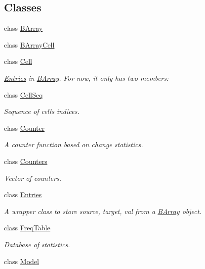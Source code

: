 \subsection*{Classes}
\begin{DoxyCompactItemize}
\item 
class \hyperlink{classbarry_1_1_b_array}{B\+Array}
\item 
class \hyperlink{classbarry_1_1_b_array_cell}{B\+Array\+Cell}
\item 
class \hyperlink{classbarry_1_1_cell}{Cell}
\begin{DoxyCompactList}\small\item\em \hyperlink{classbarry_1_1_entries}{Entries} in \hyperlink{classbarry_1_1_b_array}{B\+Array}. For now, it only has two members\+: \end{DoxyCompactList}\item 
class \hyperlink{classbarry_1_1_cell_seq}{Cell\+Seq}
\begin{DoxyCompactList}\small\item\em Sequence of cells indices. \end{DoxyCompactList}\item 
class \hyperlink{classbarry_1_1_counter}{Counter}
\begin{DoxyCompactList}\small\item\em A counter function based on change statistics. \end{DoxyCompactList}\item 
class \hyperlink{classbarry_1_1_counters}{Counters}
\begin{DoxyCompactList}\small\item\em Vector of counters. \end{DoxyCompactList}\item 
class \hyperlink{classbarry_1_1_entries}{Entries}
\begin{DoxyCompactList}\small\item\em A wrapper class to store {\ttfamily source}, {\ttfamily target}, {\ttfamily val} from a {\ttfamily \hyperlink{classbarry_1_1_b_array}{B\+Array}} object. \end{DoxyCompactList}\item 
class \hyperlink{classbarry_1_1_freq_table}{Freq\+Table}
\begin{DoxyCompactList}\small\item\em Database of statistics. \end{DoxyCompactList}\item 
class \hyperlink{classbarry_1_1_model}{Model}

\end{DoxyCompactItemize}
